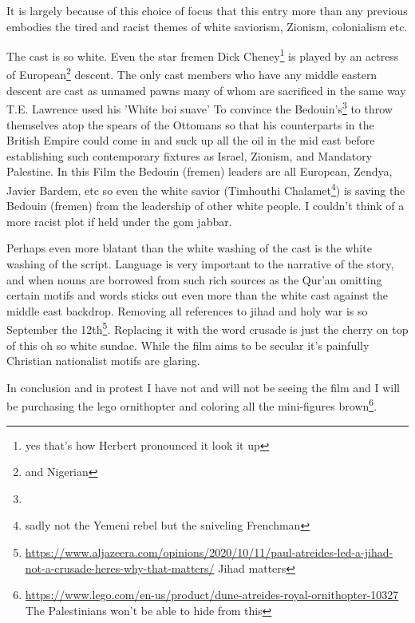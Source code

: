 \documentclass{article}
\begin{document}
 It is largely because of this choice of focus that this entry more than any previous embodies the tired and racist themes of white saviorism, Zionism, colonialism etc.

The cast is so white. Even the star fremen Dick Cheney\footnote{yes that's how Herbert pronounced it look it up} is played by an actress of European\footnote{and Nigerian} descent. The only cast members who have any middle eastern descent are cast as unnamed pawns many of whom are sacrificed in the same way T.E. Lawrence used his 'White boi suave' To convince the Bedouin's\footnote{} to throw themselves atop the spears of the Ottomans so that his counterparts in the British Empire could come in and suck up all the oil in the mid east before establishing such contemporary fixtures as Israel, Zionism, and Mandatory Palestine. In this Film the Bedouin (fremen) leaders are all European, Zendya, Javier Bardem, etc so even the white savior (Timhouthi Chalamet\footnote{sadly not the Yemeni rebel but the sniveling Frenchman}) is saving the Bedouin (fremen) from the leadership of other white people. I couldn't think of a more racist plot if held under the gom jabbar.

Perhaps even more blatant than the white washing of the cast is the white washing of the script. Language is very important to the narrative of the story, and when nouns are borrowed from such rich sources as the Qur'an omitting certain motifs and words sticks out even more than the white cast against the middle east backdrop. Removing all references to jihad and holy war is so September the 12th\footnote{\href{https://www.aljazeera.com/opinions/2020/10/11/paul-atreides-led-a-jihad-not-a-crusade-heres-why-that-matters/}{https://www.aljazeera.com/opinions/2020/10/11/paul-atreides-led-a-jihad-not-a-crusade-heres-why-that-matters/} Jihad matters}. Replacing it with the word crusade is just the cherry on top of this oh so white sundae. While the film aims to be secular it's painfully Christian nationalist motifs are glaring.

In conclusion and in protest I have not and will not be seeing the film and I will be purchasing the lego ornithopter and coloring all the mini-figures brown\footnote{\href{https://www.lego.com/en-us/product/dune-atreides-royal-ornithopter-10327}{https://www.lego.com/en-us/product/dune-atreides-royal-ornithopter-10327} The Palestinians won't be able to hide from this}.

\hfill \break

\noindent{}
\end{document}
